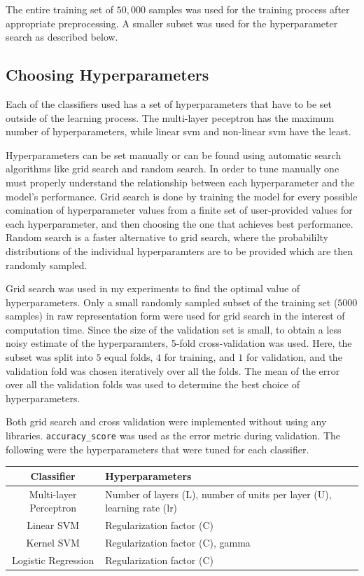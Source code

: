 \documentclass[12pt]{article}
\begin{document}
The entire training set of $50,000$ samples was used for the training process after appropriate preprocessing. A smaller subset was used for the hyperparameter search as described below.

\subsection*{Choosing Hyperparameters}

Each of the classifiers used has a set of hyperparameters that have to be set outside of the learning process. The multi-layer peceptron has the maximum number of hyperparameters, while linear svm and non-linear svm have the least.

Hyperparameters can be set manually or can be found using automatic search algorithms like grid search and random search. In order to tune manually one must properly understand the relationship between each hyperparameter and the model's performance. Grid search is done by training the model for every possible comination of hyperparameter values from a finite set of user-provided values for each hyperparameter, and then choosing the one that achieves best performance. Random search is a faster alternative to grid search, where the probabililty distributions of the individual hyperparamters are to be provided which are then randomly sampled.

Grid search was used in my experiments to find the optimal value of hyperparameters. Only a small randomly sampled subset of the training set ($5000$ samples) in raw representation form were used for grid search in the interest of computation time. Since the size of the validation set is small, to obtain a less noisy estimate of the hyperparamters, 5-fold cross-validation was used. Here, the subset was split into $5$ equal folds, $4$ for training, and $1$ for validation, and the validation fold was chosen iteratively over all the folds. The mean of the error over all the validation folds was used to determine the best choice of hyperparameters. 

Both grid search and cross validation were implemented without using any libraries. \texttt{accuracy\_score} was used as the error metric during validation. The following were the hyperparameters that were tuned for each classifier.

\begin{center}
 \begin{tabular}{|c|m{10em}|}
 \hline
 Classifier & Hyperparameters \\
 \hline
 Multi-layer Perceptron & Number of layers (L), number of units per layer (U), learning rate (lr) \\
 \hline
 Linear SVM & Regularization factor (C) \\
 \hline
 Kernel SVM & Regularization factor (C), gamma\\
 \hline
 Logistic Regression & Regularization factor (C) \\
 \hline
 \end{tabular}
\end{center}
\end{document}
